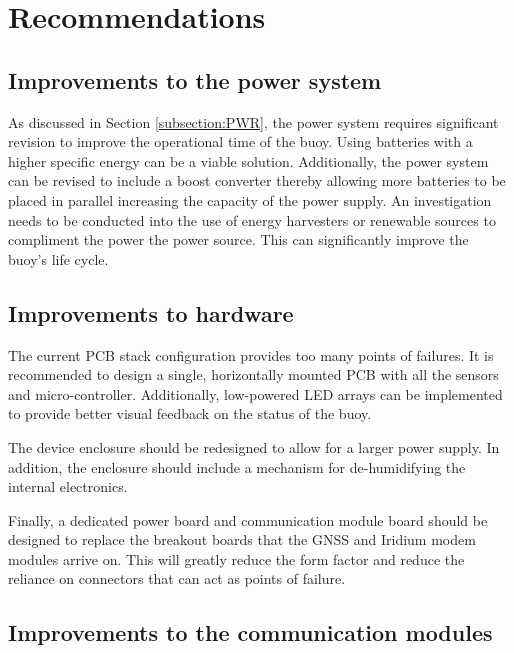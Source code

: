 
\chapter{Recommendations}
\label{ch:recommendations}
\section{Improvements to the power system}

As discussed in Section \ref{subsection:PWR}, the power system requires significant revision to improve the operational time of the buoy. Using batteries with a higher specific energy can be a viable solution. Additionally, the power system can be revised to include a boost converter thereby allowing more batteries to be placed in parallel increasing the capacity of the power supply. An investigation needs to be conducted into the use of energy harvesters or renewable sources to compliment the power the power source. This can significantly improve the buoy's life cycle.

\section{Improvements to hardware}

The current PCB stack configuration provides too many points of failures. It is recommended to design a single, horizontally mounted PCB with all the sensors and micro-controller. Additionally, low-powered LED arrays can be implemented to provide better visual feedback on the status of the buoy.\par 

The device enclosure should be redesigned to allow for a larger power supply. In addition, the enclosure should include a mechanism for de-humidifying the internal electronics. 

Finally, a dedicated power board and communication module board should be designed to replace the breakout boards that the GNSS and Iridium modem modules arrive on. This will greatly reduce the form factor and reduce the reliance on connectors that can act as points of failure.
\section{Improvements to the communication modules}

